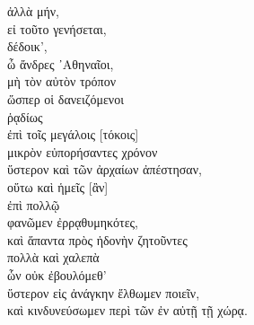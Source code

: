 {\large
\begin{greek}
\noindent ἀλλὰ μήν,\\
εἰ τοῦτο γενήσεται,\\
δέδοικ',\\
\tabto{2em} ὦ ἄνδρες ᾿Αθηναῖοι,\\
μὴ τὸν αὐτὸν τρόπον\\
\tabto{2em} ὥσπερ οἱ δανειζόμενοι \\
\tabto{4em} ῥᾳδίως \\
\tabto{4em} ἐπὶ τοῖς μεγάλοις [τόκοις] \\
\tabto{2em} μικρὸν εὐπορήσαντες χρόνον \\
\tabto{2em} ὕστερον καὶ τῶν ἀρχαίων ἀπέστησαν,\\
οὕτω καὶ ἡμεῖς [ἂν] \\
\tabto{2em} ἐπὶ πολλῷ \\
φανῶμεν ἐρρᾳθυμηκότες,\\
καὶ ἅπαντα πρὸς ἡδονὴν ζητοῦντες \\
\tabto{2em} πολλὰ καὶ χαλεπὰ \\
\tabto{3em} ὧν οὐκ ἐβουλόμεθ' \\
\tabto{2em} ὕστερον εἰς ἀνάγκην ἔλθωμεν ποιεῖν,\\
\tabto{2em} καὶ κινδυνεύσωμεν περὶ τῶν ἐν αὐτῇ τῇ χώρᾳ.\\

\end{greek}
}

